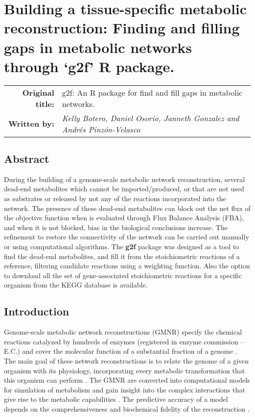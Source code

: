 \chapter{Building a tissue-specific metabolic reconstruction: Finding and filling gaps in metabolic networks through `g2f' R package.}
\begin{tabular}{rm{12.5cm}}
\textsf{\textbf{Original title:}}& g2f: An R package for find and fill gaps in metabolic networks.\\
\textsf{\textbf{Written by:}} & \textit{Kelly Botero, Daniel Osorio, Janneth Gonzalez and Andrés Pinzón-Velasco}\\ 
\end{tabular}
\section*{Abstract}
During the building of a genome-scale metabolic network reconstruction, several dead-end metabolites which cannot be imported/produced, or that are not used as substrates or released by not any of the reactions incorporated into the network. The presence of these dead-end metabolites can block out the net flux of the objective function when is evaluated through Flux Balance Analysis (FBA), and when it is not blocked, bias in the biological conclusions increase. The refinement to restore the connectivity of the network can be carried out manually or using computational algorithms. The \textbf{g2f} package was designed as a tool to find the dead-end metabolites, and fill it from the stoichiometric reactions of a reference, filtering candidate reactions using a weighting function. Also the option to download all the set of gene-associated stoichiometric reactions for a specific organism from the KEGG database is available.
\section{Introduction}
Genome-scale metabolic network reconstructions (GMNR) specify the chemical reactions catalyzed by hundreds of enzymes (registered in enzyme commission – E.C.) and cover the molecular function of a substantial fraction of a genome \cite{szappanos2011integrated}. The main goal of these network reconstructions is to relate the genome of a given organism with its physiology, incorporating every metabolic transformation that this organism can perform \cite{chen2012metabolic,agren2013raven}. The GMNR are converted into computational models for simulation of metabolism and gain insight into the complex interactions that give rise to the metabolic capabilities \cite{alper2005identifying,fong2005silico}. The predictive accuracy of a model depends on the comprehensiveness and biochemical fidelity of the reconstruction \cite{Thiele2014}. \\

